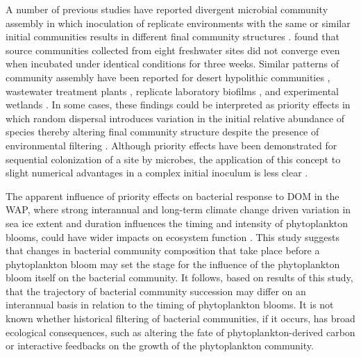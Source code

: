 A number of previous studies have reported divergent microbial community assembly in which inoculation of replicate environments with the same or similar initial communities results in different final community structures \citep{pagaling2014community}. \citet{langenheder2006structure} found that source communities collected from eight freshwater sites did not converge even when incubated under identical conditions for three weeks. Similar patterns of community assembly have been reported for desert hypolithic communities \citep{caruso2011stochastic}, wastewater treatment plants \citep{ofiteru2010pnas}, replicate laboratory biofilms \citep{Roeselers2006-tp}, and experimental wetlands \citep{baptista2008}. In some cases, these findings could be interpreted as priority effects in which random dispersal introduces variation in the initial relative abundance of species thereby altering final community structure despite the presence of environmental filtering \citep{nemergut2013patterns,chase2007drought,drake1990communities,fukami2011community}. Although priority effects have been demonstrated for sequential colonization of a site by microbes, the application of this concept to slight numerical advantages in a complex initial inoculum is less clear \citep{jiang2008community,peay2010evidence,warren2003mapping}. 

The apparent influence of priority effects on bacterial response to DOM in the WAP, where strong interannual and long-term climate change driven variation in sea ice extent and duration influences the timing and intensity of phytoplankton blooms, could have wider impacts on ecosystem function \citep{smith2008bellingshausen}. This study suggests that changes in bacterial community composition that take place before a phytoplankton bloom may set the stage for the influence of the phytoplankton bloom itself on the bacterial community. It follows, based on results of this study, that the trajectory of bacterial community succession may differ on an interannual basis in relation to the timing of phytoplankton blooms. It is not known whether historical filtering of bacterial communities, if it occurs, has broad ecological consequences, such as altering the fate of phytoplankton-derived carbon or interactive feedbacks on the growth of the phytoplankton community. 
